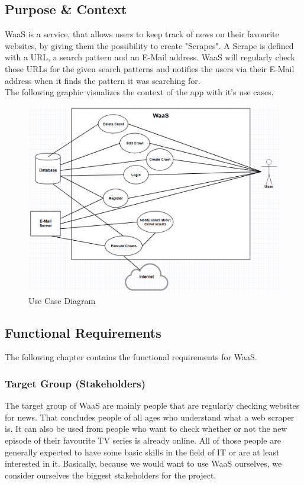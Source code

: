 \documentclass[titlepage, 12pt]{article}
\begin{document}
\subsection{Purpose \& Context}

WaaS is a service, that allows users to keep track of news on their favourite websites, by giving them the possibility to create "Scrapes". A Scrape is defined with a URL, a search pattern and an E-Mail address. WaaS will regularly check those URLs for the given search patterns and notifies the users via their E-Mail address when it finds the pattern it was searching for.
\medskip \\
The following graphic visualizes the context of the app with it's use cases.

\begin{figure}[H]
  \includegraphics[width=0.95\linewidth]{UseCaseDiagram.PNG}
  \caption{Use Case Diagram}
  \label{fig:useCaseDiagram}
\end{figure}

\subsection{Functional Requirements}

The following chapter contains the functional requirements for WaaS.

\subsubsection{Target Group (Stakeholders)}

The target group of WaaS are mainly people that are regularly checking websites for news. That concludes people of all ages who understand what a web scraper is. It can also be used from people who want to check whether or not the new episode of their favourite TV series is already online. All of those people are generally expected to have some basic skills in the field of IT or are at least interested in it.
Basically, because we would want to use WaaS ourselves, we consider ourselves the biggest stakeholders for the project.
\end{document}
